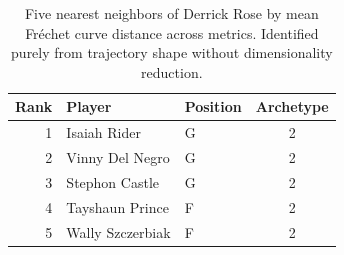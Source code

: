 \begin{table}[htbp]
  \centering\small
  \begin{tabular}{rllc}
    \toprule
    Rank & Player & Position & Archetype \\
    \midrule
    1 & Isaiah Rider & G & 2 \\
    2 & Vinny Del Negro & G & 2 \\
    3 & Stephon Castle & G & 2 \\
    4 & Tayshaun Prince & F & 2 \\
    5 & Wally Szczerbiak & F & 2 \\
    \bottomrule
  \end{tabular}
  \caption{Five nearest neighbors of Derrick Rose by mean Fr\'{e}chet curve distance across metrics. Identified purely from trajectory shape without dimensionality reduction.}
  \label{tab:Derrick_Rose_frechet_curve_neighbors}
\end{table}

